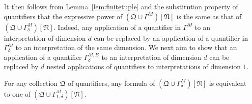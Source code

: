 \documentclass[a4paper,UKenglish,cleveref, autoref, thm-restate, anonymous]{lipics-v2021}
\begin{document}
  It then follows from Lemma~\ref{lem:finitetuple} and the substitution property of quantifiers that the expressive power of $(\mathfrak{Q} \cup \Gamma^{M})[\mathfrak{N}]$ is the same as that of $(\mathfrak{Q} \cup \Gamma^{M}_{\delta})[\mathfrak{N}]$.  Indeed, any application of a quantifier in $\Gamma^M$ to an interpretation of dimension $d$ can be replaced by an application of a quantifier in $\Gamma^{M}_{\delta}$ to an interpretation of the same dimension.  We next aim to show that an application of a quantifier $\Gamma^{M,B}_{\delta}$ to an interpretation of dimension $d$ can be replaced by $d$ nested applications of quantifiers to interpretations of dimension $1$.

  \begin{lemma}\label{lem:nesting}
    For any collection $\mathfrak{Q}$ of quantifiers, any formula of $(\mathfrak{Q}  \cup \Gamma^{M}_{\delta})[\mathfrak{N}]$ is equivalent to one of $(\mathfrak{Q}  \cup \Gamma^{M}_{1,\delta})[\mathfrak{N}]$.
  \end{lemma}
\end{document}
